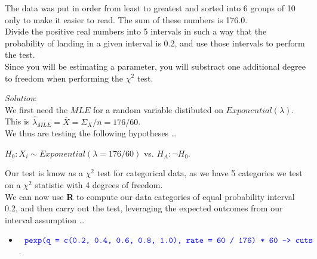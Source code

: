 \documentclass[12pt]{article}
\newcommand{\XB}{\color{black}}
\newcommand{\XBB}{\color{blue}}
\newcommand{\ds}{\displaystyle}
\begin{document}
The data was put in order from least to greatest and sorted into 6 groups of 10
only to make it easier to read. The sum of these numbers is 176.0. \\

Divide the positive real numbers into 5 intervals in such a way that the probability of
landing in a given interval is 0.2, and use those intervals to perform the test. \\

Since you will be estimating a parameter, you will substract one additional degree to
freedom when performing the $ \chi^{2} $ test. \\

\XBB\hrulefill\XB 
\vspace{5mm} 

\vspace{2.5mm} 
\textit{Solution}:
\vspace{2.5mm} \\

\noindent
We first need the $ MLE $ for a random variable distibuted on $ Exponential(\lambda) $. \\

This is $ \hat{\lambda}_{MLE} = \overline{X} = \Sigma_{X} / n = 176 / 60 $. \\

\noindent
We thus are testing the following hypotheses \dots \\

\begin{center}
    $ H_{0} : X_{i} \sim Exponential(\lambda = 176 / 60) $ vs. $ H_{A} : \lnot H_{0} $. \\
\end{center} 

\noindent
Our test is know as a $ \chi^{2} $ test for categorical data, 
as we have 5 categories we test on a $ \chi^{2} $ statistic with 4 degrees of freedom. \\

We can now use \textbf{R} to compute our data categories of equal probability interval 0.2, 
and then carry out the test, leveraging the expected outcomes from our interval assumption \dots \\

\begin{itemize}
    \item $ \ds {\XBB \texttt{ pexp(q = c(0.2, 0.4, 0.6, 0.8, 1.0), rate = 60 / 176) * 60 -> cuts }} $.
\end{itemize}
\end{document}
